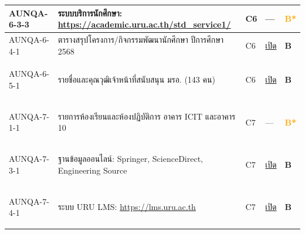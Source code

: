\begin{longtable}{|>{\raggedright\arraybackslash}p{2.3cm}|>{\raggedright\arraybackslash}p{6.5cm}|>{\centering\arraybackslash}p{1.1cm}|>{\raggedright\arraybackslash}p{3.4cm}|>{\centering\arraybackslash}p{0.8cm}|}
  \hline
  \hypertarget{ref:AUNQA-6-3-3}{AUNQA-6-3-3} & ระบบบริการนักศึกษา: \url{https://academic.uru.ac.th/std_service1/} & C6 & — & \textcolor{orange}{\textbf{B*}} \\
  \hline
  \hypertarget{ref:AUNQA-6-4-1}{AUNQA-6-4-1} & ตารางสรุปโครงการ/กิจกรรมพัฒนานักศึกษา ปีการศึกษา 2568 & C6 & \href{https://syweb.kidcbc.work/Eviden_aunqa68/\%E0\%B8\%AB\%E0\%B8\%A5\%E0\%B8\%B1\%E0\%B8\%81\%E0\%B8\%90\%E0\%B8\%B2\%E0\%B8\%99\%E0\%B8\%81\%E0\%B8\%B2\%E0\%B8\%A3\%E0\%B8\%9B\%E0\%B8\%A3\%E0\%B8\%B0\%E0\%B8\%8A\%E0\%B8\%B8\%E0\%B8\%A1/01_\%E0\%B8\%A3\%E0\%B8\%B0\%E0\%B8\%94\%E0\%B8\%B1\%E0\%B8\%9A\%E0\%B8\%AB\%E0\%B8\%A5\%E0\%B8\%B1\%E0\%B8\%81\%E0\%B8\%AA\%E0\%B8\%B9\%E0\%B8\%95\%E0\%B8\%A3/\%E0\%B8\%81\%E0\%B8\%A1\%E0\%B8\%A8_2568-10-11_\%E0\%B8\%A3\%E0\%B8\%B1\%E0\%B8\%9A\%E0\%B8\%AA\%E0\%B8\%A1\%E0\%B8\%B1\%E0\%B8\%84\%E0\%B8\%A3\%E0\%B8\%99\%E0\%B8\%B1\%E0\%B8\%81\%E0\%B8\%A8\%E0\%B8\%B6\%E0\%B8\%81\%E0\%B8\%A9\%E0\%B8\%B2.pdf}{เปิด} & \textcolor{blue!70!black}{\textbf{B}} \\
  \hline
  \hypertarget{ref:AUNQA-6-5-1}{AUNQA-6-5-1} & รายชื่อและคุณวุฒิเจ้าหน้าที่สนับสนุน มรอ. (143 คน) & C6 & \href{https://syweb.kidcbc.work/Eviden_aunqa68/\%E0\%B8\%AB\%E0\%B8\%A5\%E0\%B8\%B1\%E0\%B8\%81\%E0\%B8\%90\%E0\%B8\%B2\%E0\%B8\%99\%E0\%B8\%81\%E0\%B8\%B2\%E0\%B8\%A3\%E0\%B8\%9B\%E0\%B8\%A3\%E0\%B8\%B0\%E0\%B8\%8A\%E0\%B8\%B8\%E0\%B8\%A1/02_\%E0\%B8\%A3\%E0\%B8\%B0\%E0\%B8\%94\%E0\%B8\%B1\%E0\%B8\%9A\%E0\%B8\%84\%E0\%B8\%93\%E0\%B8\%B0/\%E0\%B8\%A1\%E0\%B8\%A3\%E0\%B8\%AD_\%E0\%B8\%AA\%E0\%B8\%A0\%E0\%B8\%B2_\%E0\%B9\%80\%E0\%B8\%A1.\%E0\%B8\%A2.2569_2-69.pdf}{เปิด} & \textcolor{blue!70!black}{\textbf{B}} \\
  \hline
  \hypertarget{ref:AUNQA-7-1-1}{AUNQA-7-1-1} & รายการห้องเรียนและห้องปฏิบัติการ อาคาร ICIT และอาคาร 10 & C7 & — & \textcolor{orange}{\textbf{B*}} \\
  \hline
  \hypertarget{ref:AUNQA-7-3-1}{AUNQA-7-3-1} & ฐานข้อมูลออนไลน์: Springer, ScienceDirect, Engineering Source & C7 & \href{https://sites.google.com/uru.ac.th/online-database}{เปิด} & \textcolor{blue!70!black}{\textbf{B}} \\
  \hline
  \hypertarget{ref:AUNQA-7-4-1}{AUNQA-7-4-1} & ระบบ URU LMS: \url{https://lms.uru.ac.th} & C7 & \href{https://syweb.kidcbc.work/Eviden_aunqa68/\%E0\%B8\%AB\%E0\%B8\%A5\%E0\%B8\%B1\%E0\%B8\%81\%E0\%B8\%90\%E0\%B8\%B2\%E0\%B8\%99\%E0\%B8\%AA\%E0\%B8\%B2\%E0\%B8\%A2\%E0\%B8\%AA\%E0\%B8\%99\%E0\%B8\%B1\%E0\%B8\%9A\%E0\%B8\%AA\%E0\%B8\%99\%E0\%B8\%B8\%E0\%B8\%99/AUNQA-4-2-1_\%E0\%B8\%9B\%E0\%B8\%A3\%E0\%B8\%B0\%E0\%B8\%81\%E0\%B8\%B2\%E0\%B8\%A8\%E0\%B8\%A3\%E0\%B8\%B0\%E0\%B8\%9A\%E0\%B8\%9A\%E0\%B9\%81\%E0\%B8\%A5\%E0\%B8\%B0\%E0\%B9\%81\%E0\%B8\%99\%E0\%B8\%A7\%E0\%B8\%97\%E0\%B8\%B2\%E0\%B8\%87\%E0\%B8\%81\%E0\%B8\%B2\%E0\%B8\%A3\%E0\%B8\%AD\%E0\%B8\%B8\%E0\%B8\%97\%E0\%B8\%98\%E0\%B8\%A3\%E0\%B8\%93\%E0\%B9\%8C_2567.pdf}{เปิด} & \textcolor{blue!70!black}{\textbf{B}} \\

\end{longtable}
